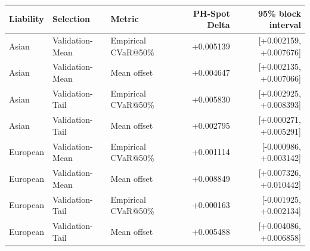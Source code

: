 \begin{tabular}{lllrr}
\toprule
Liability & Selection & Metric & PH-Spot Delta & 95\% block interval \\
\midrule
Asian & Validation-Mean & Empirical CVaR@50\% & +0.005139 & [+0.002159, +0.007676] \\
Asian & Validation-Mean & Mean offset & +0.004647 & [+0.002135, +0.007066] \\
Asian & Validation-Tail & Empirical CVaR@50\% & +0.005830 & [+0.002925, +0.008393] \\
Asian & Validation-Tail & Mean offset & +0.002795 & [+0.000271, +0.005291] \\
European & Validation-Mean & Empirical CVaR@50\% & +0.001114 & [-0.000986, +0.003142] \\
European & Validation-Mean & Mean offset & +0.008849 & [+0.007326, +0.010442] \\
European & Validation-Tail & Empirical CVaR@50\% & +0.000163 & [-0.001925, +0.002134] \\
European & Validation-Tail & Mean offset & +0.005488 & [+0.004086, +0.006858] \\
\bottomrule
\end{tabular}
